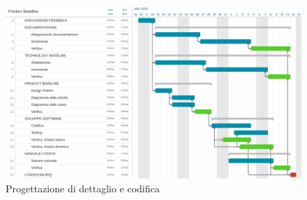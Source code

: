 \begin{figure}[htbp]
	\centering
	\includegraphics[width=15cm,keepaspectratio]{../includes/pics/grafici/Gantt_progettazione_dettaglio_codifica.jpeg}
	\caption{\label{fig:mission} Progettazione di dettaglio e codifica}
\end{figure}

\clearpage
